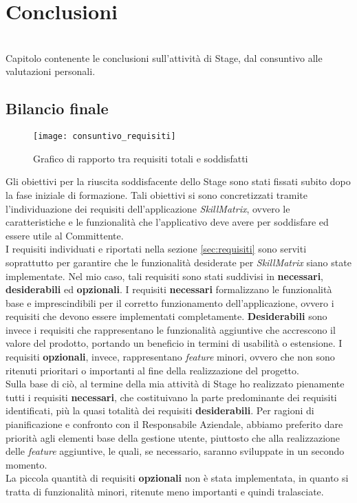 
\chapter{Conclusioni}
\label{cap:conclusioni}

\\
Capitolo contenente le conclusioni sull'attività di Stage, dal consuntivo alle valutazioni personali.

\section{Bilancio finale}
\begin{figure}[!ht] 
    \centering 
    \texttt{[image: consuntivo\_requisiti]} 
    \caption{Grafico di rapporto tra requisiti totali e soddisfatti}
\end{figure}
Gli obiettivi per la riuscita soddisfacente dello Stage sono stati fissati subito dopo la fase iniziale di formazione. Tali obiettivi si sono concretizzati tramite l'individuazione dei requisiti dell'applicazione \emph{SkillMatrix}, ovvero le caratteristiche e le funzionalità che l'applicativo deve avere per soddisfare ed essere utile al Committente.\\
I requisiti individuati e riportati nella sezione \ref{sec:requisiti} sono serviti soprattutto per garantire che le funzionalità desiderate per \emph{SkillMatrix} siano state implementate. Nel mio caso, tali requisiti sono stati suddivisi in \textbf{necessari}, \textbf{desiderabili} ed \textbf{opzionali}. I requisiti \textbf{necessari} formalizzano le funzionalità base e imprescindibili per il corretto funzionamento dell'applicazione, ovvero i requisiti che devono essere implementati completamente. \textbf{Desiderabili} sono invece i requisiti che rappresentano le funzionalità aggiuntive che accrescono il valore del prodotto, portando un beneficio in termini di usabilità o estensione. I requisiti \textbf{opzionali}, invece, rappresentano \emph{feature} minori, ovvero che non sono ritenuti prioritari o importanti al fine della realizzazione del progetto.\\
Sulla base di ciò, al termine della mia attività di Stage ho realizzato pienamente tutti i requisiti \textbf{necessari}, che costituivano la parte predominante dei requisiti identificati, più la quasi totalità dei requisiti \textbf{desiderabili}. Per ragioni di pianificazione e confronto con il Responsabile Aziendale, abbiamo preferito dare priorità agli elementi base della gestione utente, piuttosto che alla realizzazione delle \emph{feature} aggiuntive, le quali, se necessario, saranno sviluppate in un secondo momento.\\
La piccola quantità di requisiti \textbf{opzionali} non è stata implementata, in quanto si tratta di funzionalità minori, ritenute meno importanti e quindi tralasciate.

